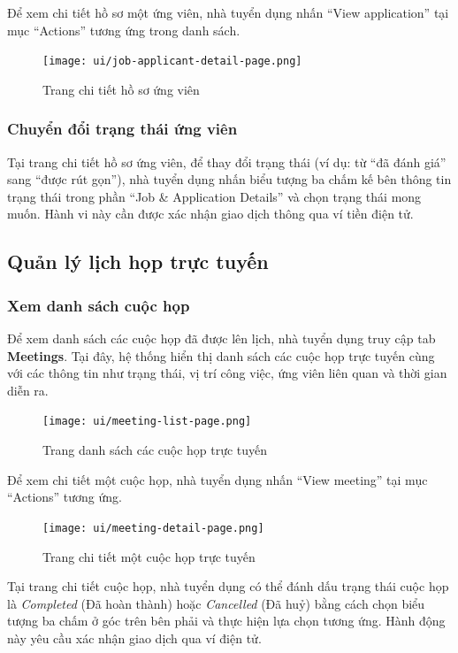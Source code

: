 Để xem chi tiết hồ sơ một ứng viên, nhà tuyển dụng nhấn ``View application'' tại mục ``Actions'' tương ứng trong danh sách.

\begin{figure}[H]
  \centering
  \texttt{[image: ui/job-applicant-detail-page.png]}
  \caption{Trang chi tiết hồ sơ ứng viên}
  \label{fig:job-applicant-detail-page}
\end{figure}

\subsubsection{Chuyển đổi trạng thái ứng viên}

Tại trang chi tiết hồ sơ ứng viên, để thay đổi trạng thái (ví dụ: từ ``đã đánh giá'' sang ``được rút gọn''), nhà tuyển dụng nhấn biểu tượng ba chấm kế bên thông tin trạng thái trong phần ``Job \& Application Details'' và chọn trạng thái mong muốn.
Hành vi này cần được xác nhận giao dịch thông qua ví tiền điện tử.

\subsection{Quản lý lịch họp trực tuyến}

\subsubsection{Xem danh sách cuộc họp}

Để xem danh sách các cuộc họp đã được lên lịch, nhà tuyển dụng truy cập tab \textbf{Meetings}.  
Tại đây, hệ thống hiển thị danh sách các cuộc họp trực tuyến cùng với các thông tin như trạng thái, vị trí công việc, ứng viên liên quan và thời gian diễn ra.

\begin{figure}[H]
  \centering
  \texttt{[image: ui/meeting-list-page.png]}
  \caption{Trang danh sách các cuộc họp trực tuyến}
  \label{fig:meeting-list-page}
\end{figure}

Để xem chi tiết một cuộc họp, nhà tuyển dụng nhấn ``View meeting'' tại mục ``Actions'' tương ứng.

\begin{figure}[H]
  \centering
  \texttt{[image: ui/meeting-detail-page.png]}
  \caption{Trang chi tiết một cuộc họp trực tuyến}
  \label{fig:meeting-detail-page}
\end{figure}

Tại trang chi tiết cuộc họp, nhà tuyển dụng có thể đánh dấu trạng thái cuộc họp là \textit{Completed} (Đã hoàn thành) hoặc \textit{Cancelled} (Đã huỷ) bằng cách chọn biểu tượng ba chấm ở góc trên bên phải và thực hiện lựa chọn tương ứng.  
Hành động này yêu cầu xác nhận giao dịch qua ví điện tử.

